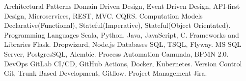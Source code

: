   \begin{cvskills}
    \cvskill
      {Architectural Patterns} 
      { Domain Driven Design, Event Driven Design, API-first Design, Microservices, REST, MVC.}
    \cvskill
      {} 
      {  CQRS.}
    \cvskill
      {Computation Models} 
      { Declarative(Functional), Stateful(Imperative), Stateful(Object Orientated).} 
    \cvskill
      {Programming Languages} 
      { Scala, Python.}
    \cvskill
      {} 
      {  Java, JavaScript, C.}
    \cvskill
      {Frameworks and Libraries} 
      { Flask.}
    \cvskill
      {} 
      { Dropwizard, Node.js}
    \cvskill
      {Databases} 
      { SQL, TSQL, Flyway.}
    \cvskill
      {} 
      {  MS SQL Server, PostgresSQL, Alembic.}
    \cvskill
      {Process Automation}
      { Camunda, BPMN 2.0.}
    \cvskill
      {DevOps} 
      { GitLab CI/CD, GitHub Actions, Docker, Kubernetes.} 
    \cvskill
      {Version Control} 
      { Git, Trunk Based Development, Gitflow.} 
    \cvskill
      {Project Management} 
      { Jira.} 
  \end{cvskills}
